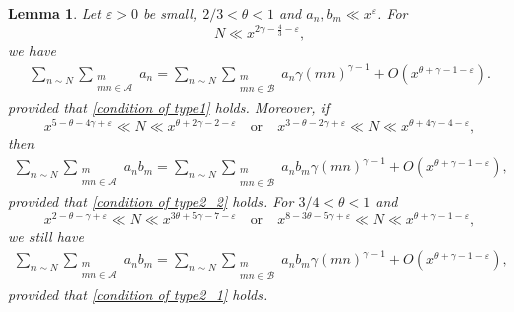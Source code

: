 \documentclass[12pt, reqno, twoside, letterpaper]{amsart}
\numberwithin{equation}{section}
\newcommand{\cA}{\ensuremath{\mathcal{A}}}
\newcommand{\cB}{\ensuremath{\mathcal{B}}}
\theoremstyle{customthm}
\newtheorem{lemma}[X]{Lemma}
\theoremstyle{customrem}
\begin{document}
\begin{lemma}\label{harman sieve type I II information}
Let $\varepsilon>0$ be small, $2/3 < \theta < 1$ and $a_n,b_m \ll x^{\varepsilon}$. For
$$
N \ll x^{2\gamma -\frac{4}{3} -\varepsilon},
$$
we have 
\begin{align}\label{harman sieve type I}
\sum_{n \sim N} \sum_{\substack{m \\ mn \in \cA}} a_n  = \sum_{n \sim N} \sum_{\substack{m \\ mn \in \cB}} a_n \gamma (mn)^{\gamma-1} + O(x^{\theta + \gamma - 1 -\varepsilon}).
\end{align}
provided that \eqref{condition of type1} holds.
Moreover, if
$$
x^{5-\theta-4\gamma +\varepsilon}\ll N \ll x^{\theta+2\gamma-2-\varepsilon} \quad \text{or} \quad x^{3-\theta-2\gamma+\varepsilon} \ll N \ll x^{\theta + 4\gamma -4-\varepsilon},
$$
then
\begin{align}\label{harman sieve type II_2}
	\sum_{n \sim N} \sum_{\substack{m \\ mn \in \cA}} a_n b_m  = \sum_{n \sim N} \sum_{\substack{m \\ mn \in \cB}} a_n b_m \gamma (mn)^{\gamma-1} + O(x^{\theta + \gamma - 1 - \varepsilon}),
\end{align}
provided that \eqref{condition of type2_2} holds. For $3/4 < \theta <1$ and
$$
x^{2-\theta-\gamma +\varepsilon}\ll N \ll x^{3\theta+5\gamma-7-\varepsilon} \quad \text{or} \quad x^{8-3\theta-5\gamma+\varepsilon} \ll N \ll x^{\theta + \gamma -1-\varepsilon},
$$ 
we still have
\begin{align}\label{harman sieve type II_1}
	\sum_{n \sim N} \sum_{\substack{m \\ mn \in \cA}} a_n b_m  = \sum_{n \sim N} \sum_{\substack{m \\ mn \in \cB}} a_n b_m \gamma (mn)^{\gamma-1} + O(x^{\theta + \gamma - 1 - \varepsilon}),
\end{align}
provided that \eqref{condition of type2_1} holds.
\end{lemma}
\end{document}
